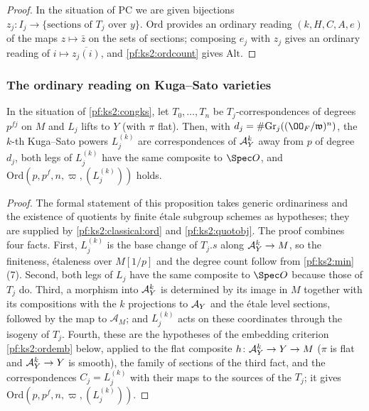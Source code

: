 \begin{proof}
In the situation of $\mathrm{PC}$ we are given bijections $z_j\colon I_j\to\{\text{sections of }
T_j\text{ over }y\}$. $\mathrm{Ord}$ provides an ordinary reading $(k,H,C,A,e)$ of the maps
$z\mapsto\bar z$ on the sets of sections; composing $e_j$ with $z_j$ gives an ordinary reading of
$i\mapsto\overline{z_j(i)}$, and \cref{pf:ks2:ordcount} gives $\mathrm{Alt}$.
\end{proof}

\subsubsection{The ordinary reading on Kuga--Sato varieties}

\begin{proposition}\label{pf:ks2:ordkse}
In the situation of \cref{pf:ks2:congks}, let $T_0,\dots,T_n$ be $T_j$-correspondences of degrees
$p^{fj}$ on $M$ and $L_j$ lifts to $Y$ (with $\pi$ flat). Then, with
$d_j=\#\mathrm{Gr}_j((\kstwoOF/\mathfrak w)^n)$, the $k$-th Kuga--Sato powers $L_j^{(k)}$ are
correspondences of $\mathcal{A}_Y^k$ away from $p$ of degree $d_j$, both legs of $L_j^{(k)}$ have the same
composite to $\Spec O$, and $\mathrm{Ord}(p,p^f,n,\varpi,(L_j^{(k)}))$ holds.
\end{proposition}

\begin{proof}
The formal statement of this proposition takes generic ordinariness and the existence of
quotients by finite \'etale subgroup schemes as hypotheses; they are supplied by
\cref{pf:ks2:classical:ord} and \cref{pf:ks2:quotobj}. The proof combines
four facts.
First, $L_j^{(k)}$ is the base change of $T_j.s$ along $\mathcal{A}_Y^k\to M$, so the finiteness,
\'etaleness over $M[1/p]$ and the degree count follow from
\cref{pf:ks2:min}(7). Second, both legs of $L_j$ have the same composite to $\Spec O$ because
those of $T_j$ do. Third, a morphism into $\mathcal{A}_Y^k$ is determined by its image in $M$ together
with its compositions with the $k$ projections to $\mathcal{A}_Y$ and the \'etale level sections,
followed by the map to $\mathcal A_M$; and $L_j^{(k)}$ acts on these
coordinates through the isogeny of $T_j$.
Fourth, these are the hypotheses of the embedding criterion \cref{pf:ks2:ordemb} below, applied to
the flat composite $h\colon\mathcal{A}_Y^k\to Y\to M$ ($\pi$ is flat and $\mathcal{A}_Y^k\to Y$ is smooth),
the family of sections of the third fact, and the correspondences $C_j=L_j^{(k)}$ with their maps to
the sources of the $T_j$; it gives $\mathrm{Ord}(p,p^f,n,\varpi,(L_j^{(k)}))$.
\end{proof}


